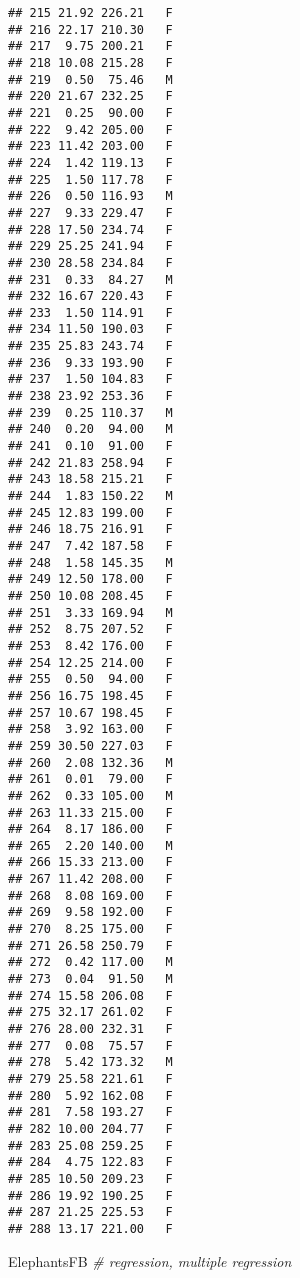\documentclass[
]{book}
\newenvironment{Shaded}{\begin{snugshade}}{\end{snugshade}}
\newcommand{\CommentTok}[1]{\textcolor[rgb]{0.56,0.35,0.01}{\textit{#1}}}
\newcommand{\NormalTok}[1]{#1}
\begin{document}
\begin{verbatim}
## 215 21.92 226.21   F
## 216 22.17 210.30   F
## 217  9.75 200.21   F
## 218 10.08 215.28   F
## 219  0.50  75.46   M
## 220 21.67 232.25   F
## 221  0.25  90.00   F
## 222  9.42 205.00   F
## 223 11.42 203.00   F
## 224  1.42 119.13   F
## 225  1.50 117.78   F
## 226  0.50 116.93   M
## 227  9.33 229.47   F
## 228 17.50 234.74   F
## 229 25.25 241.94   F
## 230 28.58 234.84   F
## 231  0.33  84.27   M
## 232 16.67 220.43   F
## 233  1.50 114.91   F
## 234 11.50 190.03   F
## 235 25.83 243.74   F
## 236  9.33 193.90   F
## 237  1.50 104.83   F
## 238 23.92 253.36   F
## 239  0.25 110.37   M
## 240  0.20  94.00   M
## 241  0.10  91.00   F
## 242 21.83 258.94   F
## 243 18.58 215.21   F
## 244  1.83 150.22   M
## 245 12.83 199.00   F
## 246 18.75 216.91   F
## 247  7.42 187.58   F
## 248  1.58 145.35   M
## 249 12.50 178.00   F
## 250 10.08 208.45   F
## 251  3.33 169.94   M
## 252  8.75 207.52   F
## 253  8.42 176.00   F
## 254 12.25 214.00   F
## 255  0.50  94.00   F
## 256 16.75 198.45   F
## 257 10.67 198.45   F
## 258  3.92 163.00   F
## 259 30.50 227.03   F
## 260  2.08 132.36   M
## 261  0.01  79.00   F
## 262  0.33 105.00   M
## 263 11.33 215.00   F
## 264  8.17 186.00   F
## 265  2.20 140.00   M
## 266 15.33 213.00   F
## 267 11.42 208.00   F
## 268  8.08 169.00   F
## 269  9.58 192.00   F
## 270  8.25 175.00   F
## 271 26.58 250.79   F
## 272  0.42 117.00   M
## 273  0.04  91.50   M
## 274 15.58 206.08   F
## 275 32.17 261.02   F
## 276 28.00 232.31   F
## 277  0.08  75.57   F
## 278  5.42 173.32   M
## 279 25.58 221.61   F
## 280  5.92 162.08   F
## 281  7.58 193.27   F
## 282 10.00 204.77   F
## 283 25.08 259.25   F
## 284  4.75 122.83   F
## 285 10.50 209.23   F
## 286 19.92 190.25   F
## 287 21.25 225.53   F
## 288 13.17 221.00   F
\end{verbatim}

\begin{Shaded}
\begin{Highlighting}[]
\NormalTok{ElephantsFB }\CommentTok{\# regression, multiple regression}
\end{Highlighting}
\end{Shaded}
\end{document}
